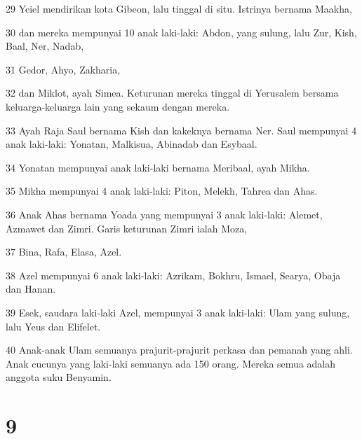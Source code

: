 \par 29 Yeiel mendirikan kota Gibeon, lalu tinggal di situ. Istrinya bernama Maakha,
\par 30 dan mereka mempunyai 10 anak laki-laki: Abdon, yang sulung, lalu Zur, Kish, Baal, Ner, Nadab,
\par 31 Gedor, Ahyo, Zakharia,
\par 32 dan Miklot, ayah Simea. Keturunan mereka tinggal di Yerusalem bersama keluarga-keluarga lain yang sekaum dengan mereka.
\par 33 Ayah Raja Saul bernama Kish dan kakeknya bernama Ner. Saul mempunyai 4 anak laki-laki: Yonatan, Malkisua, Abinadab dan Esybaal.
\par 34 Yonatan mempunyai anak laki-laki bernama Meribaal, ayah Mikha.
\par 35 Mikha mempunyai 4 anak laki-laki: Piton, Melekh, Tahrea dan Ahas.
\par 36 Anak Ahas bernama Yoada yang mempunyai 3 anak laki-laki: Alemet, Azmawet dan Zimri. Garis keturunan Zimri ialah Moza,
\par 37 Bina, Rafa, Elasa, Azel.
\par 38 Azel mempunyai 6 anak laki-laki: Azrikam, Bokhru, Ismael, Searya, Obaja dan Hanan.
\par 39 Esek, saudara laki-laki Azel, mempunyai 3 anak laki-laki: Ulam yang sulung, lalu Yeus dan Elifelet.
\par 40 Anak-anak Ulam semuanya prajurit-prajurit perkasa dan pemanah yang ahli. Anak cucunya yang laki-laki semuanya ada 150 orang. Mereka semua adalah anggota suku Benyamin.

\chapter{9}

